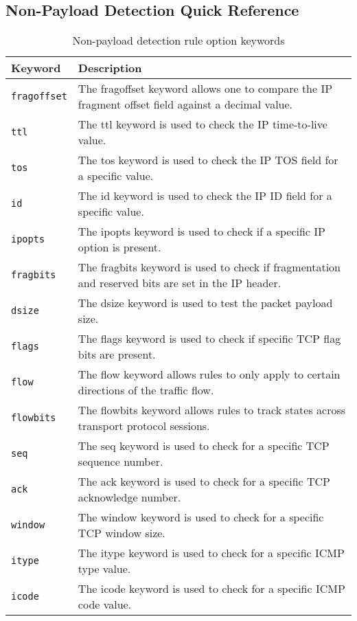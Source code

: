 \documentclass[english]{report}
\begin{document}
\subsection{Non-Payload Detection Quick Reference}
\begin{center}
\begin{longtable}{| p{1in} | p{5in} |}
\caption{Non-payload detection rule option keywords} \\
\hline
Keyword & Description \\
\hline
\texttt{fragoffset} & The fragoffset keyword allows one to compare the IP fragment
offset field against a decimal value. \\
\hline
\texttt{ttl} & The ttl keyword is used to check the IP time-to-live value. \\
\hline
\texttt{tos} & The tos keyword is used to check the IP TOS field for a specific
value. \\
\hline
\texttt{id} & The id keyword is used to check the IP ID field for a specific value. \\
\hline
\texttt{ipopts} & The ipopts keyword is used to check if a specific IP option is
present. \\
\hline
\texttt{fragbits} & The fragbits keyword is used to check if fragmentation and
reserved bits are set in the IP header. \\
\hline
\texttt{dsize} & The dsize keyword is used to test the packet payload size. \\
\hline
\texttt{flags} & The flags keyword is used to check if specific TCP flag bits are
present. \\
\hline
\texttt{flow} & The flow keyword allows rules to only apply to certain directions of
the traffic flow. \\
\hline
\texttt{flowbits} & The flowbits keyword allows rules to track states across
transport protocol sessions. \\
\hline
\texttt{seq} & The seq keyword is used to check for a specific TCP sequence number. \\
\hline
\texttt{ack} & The ack keyword is used to check for a specific TCP acknowledge
number. \\
\hline
\texttt{window} & The window keyword is used to check for a specific TCP window
size. \\
\hline
\texttt{itype} & The itype keyword is used to check for a specific ICMP type value. \\
\hline
\texttt{icode} & The icode keyword is used to check for a specific ICMP code value. \\

\end{longtable}
\end{center}
\end{document}
